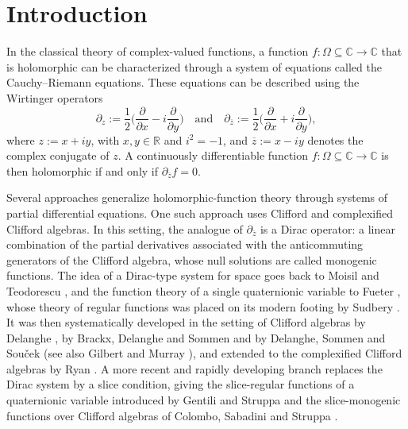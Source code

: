 \documentclass[12pt]{amsart}
\theoremstyle{plain}
\theoremstyle{definition}
\numberwithin{equation}{section}
\newcommand{\mC}{\mathbb{C}}
\newcommand{\mR}{\mathbb{R}}
\newcommand{\ra}{\rightarrow}
\begin{document}
\maketitle


\section{Introduction}\label{S:Introduction}

In the classical theory of complex-valued functions, a function $f : \Omega \subseteq \mC \ra \mC$ that is holomorphic can be characterized through a system of equations called the Cauchy--Riemann equations. These equations can be described using the Wirtinger \cite{Remmert1991}  operators 
    \[
        \partial_z := \frac{1}{2} \Big( \frac{\partial}{\partial x} - i \frac{\partial}{\partial y} \Big) \quad \text{and} \quad \partial_{\overline{z}} := \frac{1}{2} \Big( \frac{\partial}{\partial x} + i \frac{\partial}{\partial y} \Big),
    \]
where $z := x + iy$, with $x, y \in \mR$ and $i^2 = -1$, and $\overline{z} := x - iy$ denotes the complex conjugate of $z$. A continuously differentiable function $f : \Omega \subseteq \mC \ra \mC$ is then holomorphic if and only if $\partial_{\overline{z}} f = 0$.

Several approaches generalize holomorphic-function theory through systems of partial
differential equations. One such approach uses Clifford and complexified Clifford
algebras. In this setting, the analogue of $\partial_{\overline{z}}$ is a Dirac
operator: a linear combination of the partial derivatives associated with the
anticommuting generators of the Clifford algebra, whose null solutions are called
monogenic functions. The idea of a Dirac-type system for space goes back to Moisil and
Teodorescu \cite{MoisilTeodorescu1931}, and the function theory of a single quaternionic
variable to Fueter \cite{Fueter1935, Fueter1936}, whose theory of regular functions was
placed on its modern footing by Sudbery \cite{Sudbery1979}. It was then systematically
developed in the setting of Clifford algebras by Delanghe \cite{Delanghe1970}, by
Brackx, Delanghe and Sommen \cite{BrackxDelangheSommen1982} and by Delanghe, Sommen and
Sou\v{c}ek \cite{DelangheSommenSoucek1992} (see also Gilbert and Murray
\cite{GilbertMurray1991}), and extended to the complexified Clifford algebras by Ryan
\cite{Ryan1982}. A more recent and rapidly developing branch replaces the Dirac system
by a slice condition, giving the slice-regular functions of a quaternionic variable
introduced by Gentili and Struppa \cite{GentiliStruppa2007} and the slice-monogenic
functions over Clifford algebras of Colombo, Sabadini and Struppa
\cite{ColomboSabadiniStruppa2009, ColomboSabadiniStruppa2011}.
\end{document}
